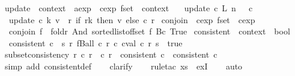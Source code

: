 \begin{isabellebody}
\isanewline
{}\isamarkupfalse%
\ update\ {\isacharcolon}{\isacharcolon}\ {\isachardoublequoteopen}context\ {\isasymRightarrow}\ aexp\ {\isasymRightarrow}\ cexp\ fset\ {\isasymRightarrow}\ context{\isachardoublequoteclose}\ \isanewline
\ \ {\isachardoublequoteopen}update\ c\ {\isacharparenleft}L\ n{\isacharparenright}\ {\isacharunderscore}\ {\isacharequal}\ c{\isachardoublequoteclose}\ {\isacharbar}\isanewline
\ \ {\isachardoublequoteopen}update\ c\ k\ v\ {\isacharequal}\ {\isacharparenleft}{\isasymlambda}r{\isachardot}\ if\ r{\isacharequal}k\ then\ v\ else\ c\ r{\isacharparenright}{\isachardoublequoteclose}\isanewline
\isanewline
{}\isamarkupfalse%
\ conjoin\ {\isacharcolon}{\isacharcolon}\ {\isachardoublequoteopen}cexp\ fset\ {\isasymRightarrow}\ cexp{\isachardoublequoteclose}\ \isanewline
\ \ {\isachardoublequoteopen}conjoin\ f\ {\isacharequal}\ foldr\ And\ {\isacharparenleft}sorted{\isacharunderscore}list{\isacharunderscore}of{\isacharunderscore}fset\ f{\isacharparenright}\ {\isacharparenleft}Bc\ True{\isacharparenright}{\isachardoublequoteclose}\isanewline
\isanewline
{}\isamarkupfalse%
\ consistent\ {\isacharcolon}{\isacharcolon}\ {\isachardoublequoteopen}context\ {\isasymRightarrow}\ bool{\isachardoublequoteclose}\ \ \isanewline
\ \ {\isachardoublequoteopen}consistent\ c\ {\isasymequiv}\ {\isasymexists}s{\isachardot}\ {\isasymforall}r{\isachardot}\ fBall\ {\isacharparenleft}c\ r{\isacharparenright}\ {\isacharparenleft}{\isasymlambda}c{\isachardot}\ {\isacharparenleft}cval\ c\ r\ s\ {\isacharequal}\ true{\isacharparenright}{\isacharparenright}{\isachardoublequoteclose}\isanewline
\isanewline
{}\isamarkupfalse%
\ subset{\isacharunderscore}consistency{\isacharcolon}\ {\isachardoublequoteopen}{\isasymforall}r{\isachardot}\ c{\isacharprime}\ r\ {\isacharbar}{\isasymsubseteq}{\isacharbar}\ c\ r\ {\isasymLongrightarrow}\ consistent\ c\ {\isasymLongrightarrow}\ consistent\ c{\isacharprime}{\isachardoublequoteclose}\isanewline
%
\isadelimproof
\ \ %
\endisadelimproof
%
\isatagproof
{}\isamarkupfalse%
\ {\isacharparenleft}simp\ add{\isacharcolon}\ consistent{\isacharunderscore}def{\isacharparenright}\isanewline
\ \ \isamarkupfalse%
\ clarify\isanewline
\ \ \isamarkupfalse%
\ {\isacharparenleft}rule{\isacharunderscore}tac\ x{\isacharequal}s\ \ exI{\isacharparenright}\isanewline
\ \ \isamarkupfalse%
\ auto%
\endisatagproof
{\isafoldproof}%
%
\isadelimproof

\end{isabellebody}
